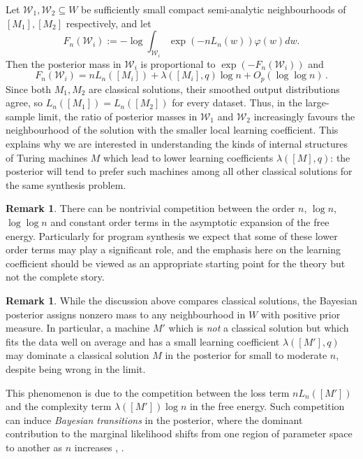 \documentclass[english,letter paper,12pt,reqno]{article}
\theoremstyle{definition}
\newtheorem{remark}[theorem]{Remark}
\begin{document}
Let $\mathcal{W}_1, \mathcal{W}_2 \subseteq W$ be sufficiently small compact semi-analytic neighbourhoods of $[M_1], [M_2]$ respectively, and let
\[
F_n(\mathcal{W}_i) := -\log \int_{\mathcal{W}_i} \exp(-n L_n(w)) \varphi(w) dw.
\]
Then the posterior mass in $\mathcal{W}_i$ is proportional to $\exp(-F_n(\mathcal{W}_i))$ and
\[
F_n(\mathcal{W}_i) = n L_n([M_i]) + \lambda([M_i], q) \log n + O_p(\log \log n)\,.
\]
Since both $M_1, M_2$ are classical solutions, their smoothed output distributions agree, so $L_n([M_1]) = L_n([M_2])$ for every dataset. Thus, in the large-sample limit, the ratio of posterior masses in $\mathcal{W}_1$ and $\mathcal{W}_2$ increasingly favours the neighbourhood of the solution with the smaller local learning coefficient. This explains why we are interested in understanding the kinds of internal structures of Turing machines $M$ which lead to lower learning coefficients $\lambda([M], q)$: the posterior will tend to prefer such machines among all other classical solutions for the same synthesis problem.

\begin{remark}
There can be nontrivial competition between the order $n$, $\log n$, $\log \log n$ and constant order terms in the asymptotic expansion of the free energy. Particularly for program synthesis we expect that some of these lower order terms may play a significant role, and the emphasis here on the learning coefficient should be viewed as an appropriate starting point for the theory but not the complete story.
\end{remark}

\begin{remark}
While the discussion above compares classical solutions, the Bayesian posterior assigns nonzero mass to any neighbourhood in $W$ with positive prior measure. In particular, a machine $M'$ which is \emph{not} a classical solution but which fits the data well on average and has a small learning coefficient $\lambda([M'], q)$ may dominate a classical solution $M$ in the posterior for small to moderate $n$, despite being wrong in the limit. 

This phenomenon is due to the competition between the loss term $n L_n([M'])$ and the complexity term $\lambda([M']) \log n$ in the free energy. Such competition can induce \emph{Bayesian transitions} in the posterior, where the dominant contribution to the marginal likelihood shifts from one region of parameter space to another as $n$ increases \cite[\S 7.6]{watanabeAlgebraicGeometryStatistical2009}, \cite{chen2023tms1}.
\end{remark}
\end{document}
